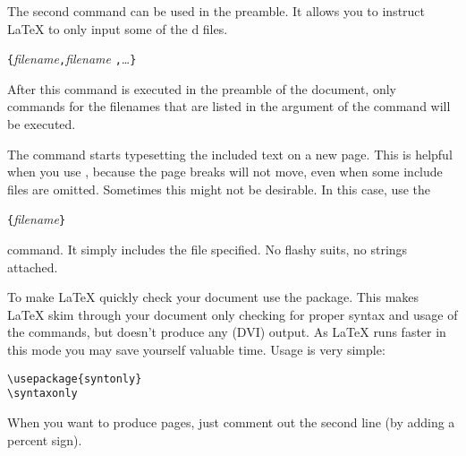 The second command can be used in the preamble. It allows you to
instruct \LaTeX{} to only input some of the \verb||d files.
\begin{lscommand}
\verb|{|\emph{filename}\verb|,|\emph{filename}%
\verb|,|\ldots\verb|}|
\end{lscommand}
After this command is executed in the preamble of the document, only
 commands for the filenames that are listed in the
argument of the  command will be executed.

The  command starts typesetting the included text on a new
page. This is helpful when you use , because the
page breaks will not move, even when some include files are omitted.
Sometimes this might not be desirable. In this case, use the
\begin{lscommand}
\verb|{|\emph{filename}\verb|}|
\end{lscommand}
\noindent command. It simply includes the file specified. 
No flashy suits, no strings attached.


To make \LaTeX{} quickly check your document use the 
package. This makes \LaTeX{} skim through your document only checking for
proper syntax and usage of the commands, but doesn't produce any (DVI) output.
As \LaTeX{} runs faster in this mode you may save yourself valuable time.
Usage is very simple:

\begin{verbatim}
\usepackage{syntonly}
\syntaxonly
\end{verbatim}
When you want to produce pages, just comment out the second line
(by adding a percent sign).


%


